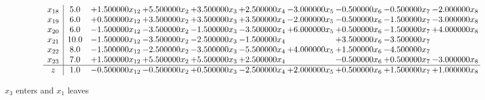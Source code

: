 \documentclass[10pt]{article}
\begin{document}
\[\begin{array}{c| c c@{\hskip 2pt} c@{\hskip 2pt} c@{\hskip 2pt} c@{\hskip 2pt} c@{\hskip 2pt} c@{\hskip 2pt} c@{\hskip 2pt} c@{\hskip 2pt} }
 x_{18}   &  5.0 & + 1.500000 x_{12} & + 5.500000 x_{2} & + 3.500000 x_{3} & + 2.500000 x_{4} & -3.000000 x_{5} & -0.500000 x_{6} & -0.500000 x_{7} & -2.000000 x_{8}\\
 x_{19}   &  6.0 & + 0.500000 x_{12} & + 3.500000 x_{2} & + 3.500000 x_{3} & + 3.500000 x_{4} & -2.000000 x_{5} & -0.500000 x_{6} & -1.500000 x_{7} & -3.000000 x_{8}\\
 x_{20}   &  6.0 & -1.500000 x_{12} & -3.500000 x_{2} & -1.500000 x_{3} & -3.500000 x_{4} & + 6.000000 x_{5} & + 0.500000 x_{6} & -1.500000 x_{7} & + 4.000000 x_{8}\\
 x_{21}   &  10.0 & -1.500000 x_{12} & -3.500000 x_{2} & -2.500000 x_{3} & -1.500000 x_{4} &   & + 3.500000 x_{6} & -3.500000 x_{7} &   \\
 x_{22}   &  8.0 & -1.500000 x_{12} & -2.500000 x_{2} & -3.500000 x_{3} & -5.500000 x_{4} & + 4.000000 x_{5} & + 1.500000 x_{6} & -4.500000 x_{7} &   \\
 x_{23}   &  7.0 & + 1.500000 x_{12} & + 5.500000 x_{2} & + 5.500000 x_{3} & + 2.500000 x_{4} &   & -0.500000 x_{6} & + 0.500000 x_{7} & -3.000000 x_{8}\\
\hline
z    &  1.0 & -0.500000 x_{12} & -0.500000 x_{2} & + 0.500000 x_{3} & -2.500000 x_{4} & + 2.000000 x_{5} & + 0.500000 x_{6} & + 1.500000 x_{7} & + 1.000000 x_{8}\\
\end{array}\]


 $ x_{3} $ enters and $ x_{1} $ leaves 
\end{document}
